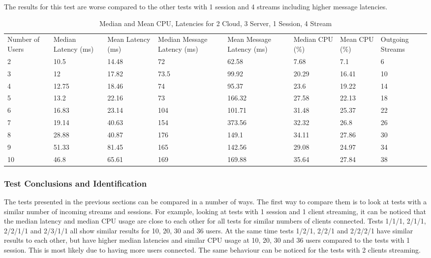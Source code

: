 The results for this test are worse compared to the other tests with 1 session and 4 streams including higher message latencies.

\begin{table}
\caption{Median and Mean CPU, Latencies for 2 Cloud, 3 Server, 1 Session, 4 Stream}
\label{table:2cld_3serv_1sess_4str}
\begin{tabu} to\linewidth{|X[c]|X[c]|X[c]|X[c]|X[c]|X[c]|X[c]|X[c]|}
\everyrow{\hline}
\hline
Number of Users & Median Latency (ms) & Mean Latency (ms) & Median Message Latency (ms) & Mean Message Latency (ms) & Median CPU (\%) & Mean CPU (\%) & Outgoing Streams\\
2 & 10.5 & 14.48 & 72 & 62.58 & 7.68 & 7.1 & 6 \\
3 & 12 & 17.82 & 73.5 & 99.92 & 20.29 & 16.41 & 10 \\
4 & 12.75 & 18.46 & 74 & 95.37 & 23.6 & 19.22 & 14 \\
5 & 13.2 & 22.16 & 73 & 166.32 & 27.58 & 22.13 & 18 \\
6 & 16.83 & 23.14 & 104 & 101.71 & 31.48 & 25.37 & 22 \\
7 & 19.14 & 40.63 & 154 & 373.56 & 32.32 & 26.8 & 26 \\
8 & 28.88 & 40.87 & 176 & 149.1 & 34.11 & 27.86 & 30 \\
9 & 51.33 & 81.45 & 165 & 142.56 & 29.08 & 24.97 & 34 \\
10 & 46.8 & 65.61 & 169 & 169.88 & 35.64 & 27.84 & 38 \\
\end{tabu}
\end{table}

\subsubsection{Test Conclusions and Identification}

The tests presented in the previous sections can be compared in a number of ways. The first way to compare them is to look at tests with a similar number of incoming streams and sessions. For example, looking at tests with 1 session and 1 client streaming, it can be noticed that the median latency and median CPU usage are close to each other for all tests for similar numbers of clients connected. Tests 1/1/1, 2/1/1, 2/2/1/1 and 2/3/1/1 all show similar results for 10, 20, 30 and 36 users. At the same time tests 1/2/1, 2/2/1 and 2/2/2/1 have similar results to each other, but have higher median latencies and similar CPU usage at 10, 20, 30 and 36 users compared to the tests with 1 session. This is most likely due to having more users connected. The same behaviour can be noticed for the tests with 2 clients streaming.

